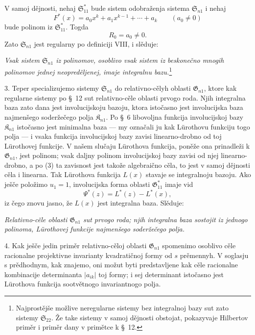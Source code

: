 \documentclass[11pt]{article}
\providecommand{\Kfield}{\mathfrak{K}}
\providecommand{\Ssys}{\mathfrak{S}}
\providecommand{\Gdom}{\mathfrak{G}}
\begin{document}
V samoj dějnosti, nehaj $\Ssys^*_{11}$ bude sistem odobraženja sistema $\Ssys_{n1}$ i nehaj
\[
  F^*(x)=a_0x^k+a_1x^{k-1}+\cdots+a_k\qquad(a_0\ne0)
\]
bude polinom iz $\Ssys^*_{11}$. Togda
\begin{equation}
  R_0=a_0\ne0.
\tag{3}
\end{equation}
Zato $\Ssys_{n1}$ jest regularny po definiciji VIII, i slěduje:

{\itshape Vsak sistem $\Ssys_{n1}$ iz polinomov, osoblivo vsak sistem iz beskonečno mnogih polinomov jednej neopreděljenej, imaje integralnu bazu.}\footnote{Najprostějše možlive neregularne sistemy bez integralnoj bazy sut zato sistemy $\Ssys_{22}$. Že take sistemy v samoj dějnosti obstojat, pokazyvaje Hilbertov priměr i priměr dany v primětce k \S\ 12.}

3. Teper specializujemo sistemy $\Ssys_{n1}$ do relativno-cělyh oblasti $\Gdom_{n1}$, ktore kak regularne sistemy po \S\ 12 sut relativno-cěle oblasti prvogo roda. Njih integralna baza zato dana jest involucijskoju bazoju, ktora istočasno jest involucijska baza najmenšego soderžečego polja $\Kfield_{n1}$. Po \S\ 6 libovoljna funkcija involucijskoj bazy $\Kfield_{n1}$ istočasno jest minimalna baza --- my označali ju kak Lürothovu funkciju togo polja --- i vsaka funkcija involucijskoj bazy zavisi linearno-drobno od toj Lürothovej funkcije. V našem slučaju Lürothova funkcija, poněže ona prinadleži k $\Gdom_{n1}$, jest polinom; vsak daljny polinom involucijskoj bazy zavisi od njej linearno-drobno, a po (3) ta zavisnost jest takože algebraično cěla, to jest v samoj dějnosti cěla i linearna. Tak Lürothova funkcija $L(x)$ stavaje se integralnoju bazoju. Ako ješče položimo $u_1=1$, involucijska forma oblasti $\Gdom^*_{11}$ imaje vid
\[
  \Psi^*(z)=L^*(z)-L^*(x),
\]
iz čego znovu jasno, že $L(x)$ jest integralna baza. Slěduje:

{\itshape Relativno-cěle oblasti $\Gdom_{n1}$ sut prvogo roda; njih integralna baza sostojit iz jednogo polinoma, Lürothovej funkcije najmenšego soderžečego polja.}

4. Kak ješče jedin priměr relativno-cěloj oblasti $\Gdom_{n1}$ spomenimo osoblivo cěle racionalne projektivne invarianty kvadratičnoj formy od $s$ prěmennyh. V soglasju s prědhodnym, kak znajemo, oni možut byti predstavljene kak cěle racionalne kombinacije determinanta $|a_{ik}|$ toj formy; i sej determinant istočasno jest Lürothova funkcija sootvětnogo invariantnogo polja.
\end{document}
